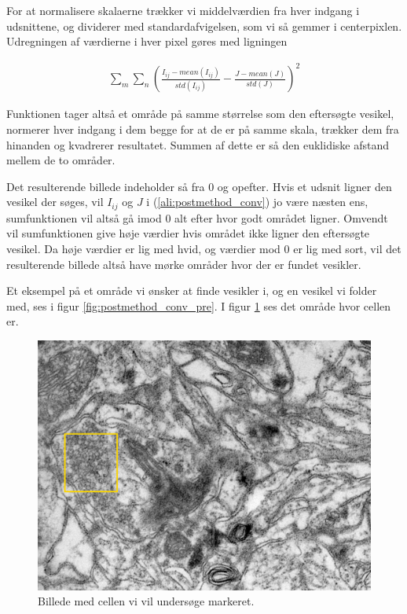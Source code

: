 For at normalisere skalaerne trækker vi middelværdien fra hver indgang i udsnittene, og dividerer med standardafvigelsen, som vi så gemmer i centerpixlen. Udregningen af værdierne i hver pixel gøres med ligningen

\begin{align}
	\sum_m\sum_n \left(\frac{I_{ij}-mean(I_{ij})}{std(I_{ij})}-\frac{J-mean(J)}{std(J)}\right)^2 \label{ali:postmethod_conv}
\end{align}

Funktionen tager altså et område på samme størrelse som den eftersøgte vesikel, normerer hver indgang i dem begge for at de er på samme skala, trækker dem fra hinanden og kvadrerer resultatet. Summen af dette er så den euklidiske afstand mellem de to områder.

Det resulterende billede indeholder så fra 0 og opefter. Hvis et udsnit ligner den vesikel der søges, vil $I_{ij}$ og $J$ i (\ref{ali:postmethod_conv}) jo være næsten ens, sumfunktionen vil altså gå imod 0 alt efter hvor godt området ligner. Omvendt vil sumfunktionen give høje værdier hvis området ikke ligner den eftersøgte vesikel. Da høje værdier er lig med hvid, og værdier mod 0 er lig med sort, vil det resulterende billede altså have mørke områder hvor der er fundet vesikler. 

Et eksempel på et område vi ønsker at finde vesikler i, og en vesikel vi folder med, ses i figur \ref{fig:postmethod_conv_pre}. I figur \ref{fig:postmethod_conv_area1} ses det område hvor cellen er.

\begin{figure}[H]
		\centering
		\includegraphics[scale=0.5]{files/postmethod/img/area_1.png}
	\caption{Billede med cellen vi vil undersøge markeret.\label{fig:postmethod_conv_area1}}
\end{figure}

